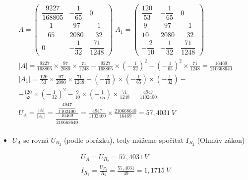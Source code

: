 \begin{center}
    \begin{gather*}
        A = 
        \begin{pmatrix}
            \dfrac{9227}{168805} & -\dfrac{1}{65} & 0 \\[8pt]
            -\dfrac{1}{65} & \dfrac{97}{2080} & -\dfrac{1}{32} \\[8pt]
            0 & -\dfrac{1}{32} & \dfrac{71}{1248}
        \end{pmatrix} \;
        A_1 =
        \begin{pmatrix}
            \dfrac{120}{53} & -\dfrac{1}{65} & 0 \\[8pt]
            \dfrac{9}{10} & \dfrac{97}{2080} & -\dfrac{1}{32} \\[8pt]
            -\dfrac{2}{10} & -\dfrac{1}{32} & \dfrac{71}{1248}
        \end{pmatrix} \\[8pt]
        \lvert A\rvert = \frac{9227}{168805} \times \frac{97}{2080} \times \frac{71}{1248} - \frac{9227}{168805} \times \left( -\frac{1}{32}\right)^2 - \left( -\frac{1}{65}\right)^2 \times \frac{71}{1248} = \frac{16469}{210668640} \\[8pt]
        \lvert A_1\rvert = \frac{120}{53} \times \frac{97}{2080} \times \frac{71}{1248} + \left( -\frac{2}{10}\right) \times \left( -\frac{1}{65}\right) \times \left( -\frac{1}{32}\right) - \\[8pt]
        - \frac{120}{53} \times \left( -\frac{1}{32}\right)^2 - \frac{9}{10} \times \left( -\frac{1}{65}\right) \times \frac{71}{1248} = \frac{4947}{1102400} \\[8pt]
        U_A = \frac{\lvert A\rvert}{\lvert A_1\rvert} = \frac{\dfrac{4947}{1102400}}{\dfrac{16469}{210668640}} = \frac{4947}{1102400} \times \frac{210668640}{16469} = 57,4031 \: V \\
    \end{gather*}
\end{center}

\begin{itemize}
    \item $U_A$ se rovná $U_{R_2}$ (podle obrázku), tedy můžeme spočítat $I_{R_2}$ (Ohmův zákon)
\end{itemize}

\begin{center}
    \begin{gather*}
        U_A = U_{R_2} = 57,4031 \: V \\[8pt]
        I_{R_2} = \frac{U_{R_2}}{R_2} = \frac{57,4031}{49} = 1,1715 \: V
    \end{gather*}
\end{center}